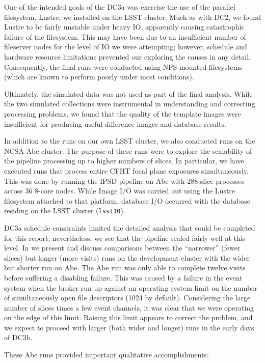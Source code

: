 One of the intended goals of the DC3a was exercise the use of the
parallel filesystem, Lustre, we installed on the LSST cluster.  Much
as with DC2, we found Lustre to be fairly unstable under heavy IO,
apparently causing catastrophic failure of the filesystem.  This may
have been due to an insufficient number of fileserver nodes for the
level of IO we were attempting; however, schedule and hardware
resource limitations prevented our exploring the causes in any
detail.  Consequently, the final runs were conducted using NFS-mounted
filesystems (which are known to perform poorly under most conditions).  

Ultimately, the simulated data was not used as part of the final
analysis.  While the two simulated collections were instrumental
in understanding and correcting processing problems, we found that the
quality of the template images were insufficient for producing useful
difference images and database results.  

In addition to the runs on our own LSST cluster, we also conducted
runs on the NCSA Abe cluster.  The purpose of these runs were to
explore the scalability of the pipeline processing up to higher
numbers of slices.  In particular, we have executed runs that process
entire CFHT focal plane exposures simultaneously.  This was done by
running the IPSD pipeline on Abe with 288 slice processes across 36
8-core nodes.  While Image I/O was carried out using the Lustre
filesystem attached to that platform, database I/O occurred with the
database residing on the LSST cluster ({\tt lsst10}).  

DC3a schedule constraints limited the detailed analysis
that could be completed for this report; nevertheless, we see that the
pipeline scaled fairly well at this level.  In  we
present and discuss comparisons between the ``narrower'' (fewer
slices) but longer (more visits) runs on the development cluster with
the wider but shorter run on Abe.  The Abe run was only able to
complete twelve visits before suffering a disabling failure.  This was
caused by a failure in the event system when the broker run up against
an operating system limit on the number of simultaneously open file
descriptors (1024 by default).  Considering the large number of slices
times a few event channels, it was clear that we were operating on the
edge of this limit.  Raising this limit appears to correct the
problem, and we expect to proceed with larger (both wider and longer)
runs in the early days of DC3b.  

These Abe runs provided important qualitative accomplishments:

